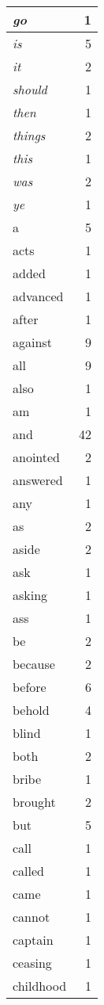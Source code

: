 \begin{center}
\begin{longtable}{l|r}
\emph{go} & 1 \\ \hline
\emph{is} & 5 \\ \hline
\emph{it} & 2 \\ \hline
\emph{should} & 1 \\ \hline
\emph{then} & 1 \\ \hline
\emph{things} & 2 \\ \hline
\emph{this} & 1 \\ \hline
\emph{was} & 2 \\ \hline
\emph{ye} & 1 \\ \hline
a & 5 \\ \hline
acts & 1 \\ \hline
added & 1 \\ \hline
advanced & 1 \\ \hline
after & 1 \\ \hline
against & 9 \\ \hline
all & 9 \\ \hline
also & 1 \\ \hline
am & 1 \\ \hline
and & 42 \\ \hline
anointed & 2 \\ \hline
answered & 1 \\ \hline
any & 1 \\ \hline
as & 2 \\ \hline
aside & 2 \\ \hline
ask & 1 \\ \hline
asking & 1 \\ \hline
ass & 1 \\ \hline
be & 2 \\ \hline
because & 2 \\ \hline
before & 6 \\ \hline
behold & 4 \\ \hline
blind & 1 \\ \hline
both & 2 \\ \hline
bribe & 1 \\ \hline
brought & 2 \\ \hline
but & 5 \\ \hline
call & 1 \\ \hline
called & 1 \\ \hline
came & 1 \\ \hline
cannot & 1 \\ \hline
captain & 1 \\ \hline
ceasing & 1 \\ \hline
childhood & 1 \\ \hline

\end{longtable}
\end{center}
